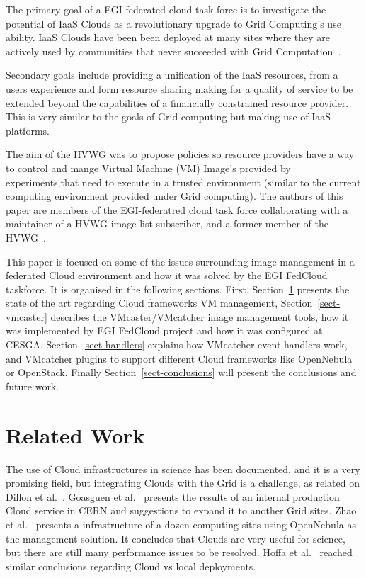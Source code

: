 \documentclass{cai}
\begin{document}
The primary goal of a EGI-federated cloud task force is to investigate the potential of IaaS Clouds as a revolutionary upgrade to Grid Computing's use ability. 
IaaS Clouds have been been deployed at many sites where they are actively used by communities that never succeeded with Grid Computation~\cite{gridcloud}. 

Secondary goals include providing a unification of the IaaS resources, from a users experience and form resource sharing making for a quality of service to be extended beyond the capabilities of a financially constrained resource provider.
This is very similar to the goals of Grid computing but making use of IaaS platforms.

The aim of the HVWG was to propose policies so resource providers have a way to control and mange Virtual Machine (VM) Image's provided by experiments,that need to execute in a trusted environment (similar to the current computing environment provided under Grid computing). 
The authors of this paper are members of the EGI-federatred cloud task force collaborating with a maintainer of a HVWG image list subscriber, and a former member of the HVWG~\cite{hepix}.

This paper is focused on some of the issues surrounding image management in a federated Cloud environment and how it was solved by the EGI FedCloud taskforce.
It is organised in the following sections. First, Section~\ref{sect-relatedwork} presents the state of the art regarding Cloud frameworks VM management, Section~\ref{sect-vmcaster} describes the VMcaster/VMcatcher image management tools, how it was implemented by EGI FedCloud project and how it was configured at CESGA. 
Section~\ref{sect-handlers} explains how VMcatcher event handlers work, and VMcatcher plugins to support different Cloud frameworks like OpenNebula or OpenStack.
Finally Section~\ref{sect-conclusions} will present the conclusions and future work.

\section{Related Work}
\label{sect-relatedwork}
The use of Cloud infrastructures in science has been documented, and it is a very promising field, but integrating Clouds with the Grid is a challenge, as related on Dillon et al.~\cite{Dillon2010}. Goasguen et al.~\cite{Goasguen2012} presents the results of an internal production Cloud service in CERN and suggestions to expand it to another Grid sites. Zhao et al.~\cite{Zhao2012} presents a infrastructure of a dozen computing sites using OpenNebula as the management solution. It concludes that Clouds are very useful for science, but there are still many performance issues to be resolved. Hoffa et al.~\cite{Hoffa2008} reached similar conclusions regarding Cloud vs local deployments.
\end{document}
